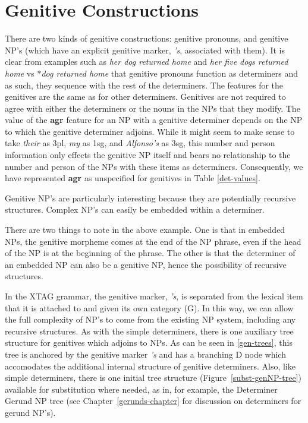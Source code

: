 \section{Genitive Constructions}

There are two kinds of genitive constructions: genitive pronouns, and genitive
NP's (which have an explicit genitive marker, {\it 's}, associated with them).
It is clear from examples such as {\it her dog returned home\/} and
{\it her five dogs returned home} vs {\it
$\ast$dog returned home\/} that genitive pronouns function as determiners and as
such, they sequence with the rest of the determiners.  The features for the
genitives are the same as for other determiners.  Genitives are not required to agree with
either the determiners or the nouns in the NPs that they modify. The
value of the {\bf agr} feature for an NP with a genitive determiner
depends on the NP to which the genitive determiner adjoins. While it
might seem to make sense to take {\it their} as 3pl, {\it my} as 1sg,
and {\it Alfonso's} as 3sg, this number and person information only
effects the genitive NP itself and bears no relationship to the number
and person of the NPs with these items as determiners. Consequently,
we have represented {\bf agr} as unspecified for genitives in Table
\ref{det-values}.

Genitive NP's are particularly interesting because they are potentially
recursive structures.  Complex NP's can easily be embedded within a determiner.


There are two things to note in the above example.  One is that in embedded
NPs, the genitive morpheme comes at the end of the NP phrase, even if the head
of the NP is at the beginning of the phrase.  The other is that the determiner
of an embedded NP can also be a genitive NP, hence the possibility of recursive
structures.

In the XTAG grammar, the genitive marker, {\it 's}, is separated from the
lexical item that it is attached to and given its own category (G).  In
this way, we can allow the full complexity of NP's to come from the
existing NP system, including any recursive structures.  As with the simple
determiners, there is one auxiliary tree structure for genitives which
adjoins to NPs. As can be seen in \ref{gen-trees}, this tree is anchored by
the genitive marker {\it 's} and has a branching D node which accomodates
the additional internal structure of genitive determiners. Also, like simple
determiners, there is one initial tree structure
(Figure~\ref{subst-genNP-tree}) available for substitution where needed, as
in, for example, the Determiner Gerund NP tree (see
Chapter~\ref{gerunds-chapter} for discussion on determiners for gerund
NP's).

